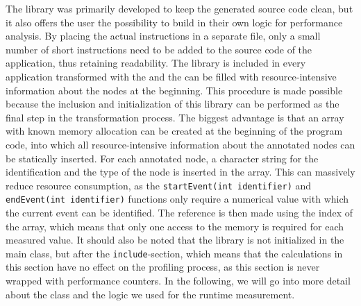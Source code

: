 The \DATA library was primarily developed to keep the generated source code clean, but it also offers the user the possibility to build in their own logic for performance analysis. By placing the actual instructions in a separate file, only a small number of short instructions need to be added to the source code of the application, thus retaining readability. The library is included in every application transformed with the \TOOL and the \DATA can be filled with resource-intensive information about the nodes at the beginning. This procedure is made possible because the inclusion and initialization of this library can be performed as the final step in the transformation process. The biggest advantage is that an array with known memory allocation can be created at the beginning of the program code, into which all resource-intensive information about the annotated nodes can be statically inserted. For each annotated node, a character string for the identification and the type of the node is inserted in the array. This can massively reduce resource consumption, as the \lstinline{startEvent(int identifier)} and \lstinline{endEvent(int identifier)} functions only require a numerical value with which the current event can be identified. The reference is then made using the index of the array, which means that only one access to the memory is required for each measured value. It should also be noted that the library is not initialized in the main class, but after the \lstinline{include}-\STATS section, which means that the calculations in this section have no effect on the profiling process, as this section is never wrapped with performance counters. In the following, we will go into more detail about the \DATA class and the logic we used for the runtime measurement. 

